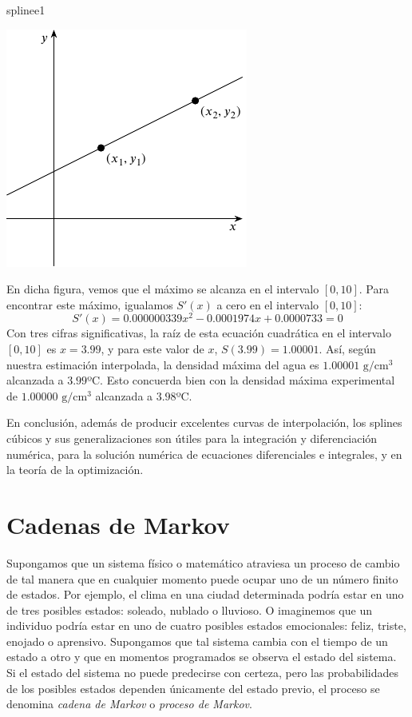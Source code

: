 \begin{examplebox}{}{splinee1}
\begin{center}
        \includegraphics[page=5]{Images/Capitulo8/figurasC8.pdf}
    \end{center}
    En dicha figura, vemos que el máximo se alcanza en el intervalo $[0, 10]$. Para encontrar este máximo, igualamos $S'(x)$ a cero en el intervalo $[0, 10]$:
    $$S'(x) = 0.000000339x^2 - 0.0001974x + 0.0000733 = 0$$
    Con tres cifras significativas, la raíz de esta ecuación cuadrática en el intervalo $[0, 10]$ es $x = 3.99$, y para este valor de $x$, $S(3.99) = 1.00001$. Así, según nuestra estimación interpolada, la densidad máxima del agua es $1.00001$ $\mathrm{g}/\mathrm{cm}^3$ alcanzada a $3.99$º$\mathrm{C}$. Esto concuerda bien con la densidad máxima experimental de $1.00000$ $\mathrm{g}/\mathrm{cm}^3$ alcanzada a $3.98$º$\mathrm{C}$.
\end{examplebox}

En conclusión, además de producir excelentes curvas de interpolación, los splines cúbicos y sus generalizaciones son útiles para la integración y diferenciación numérica, para la solución numérica de ecuaciones diferenciales e integrales, y en la teoría de la optimización.

\section{Cadenas de Markov}\label{sec:cadMarkov}

Supongamos que un sistema físico o matemático atraviesa un proceso de cambio de tal manera que en cualquier momento puede ocupar uno de un número finito de estados. Por ejemplo, el clima en una ciudad determinada podría estar en uno de tres posibles estados: soleado, nublado o lluvioso. O imaginemos que un individuo podría estar en uno de cuatro posibles estados emocionales: feliz, triste, enojado o aprensivo. Supongamos que tal sistema cambia con el tiempo de un estado a otro y que en momentos programados se observa el estado del sistema. Si el estado del sistema no puede predecirse con certeza, pero las probabilidades de los posibles estados dependen únicamente del estado previo, el proceso se denomina \emph{cadena de Markov} o \emph{proceso de Markov}.

